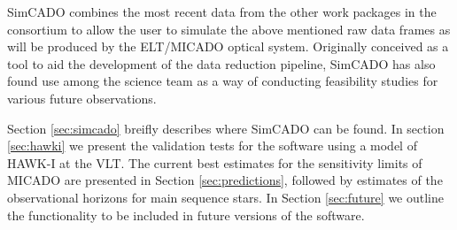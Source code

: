 SimCADO combines the most recent data from the other work packages in the consortium to allow the user to simulate the above mentioned raw data frames as will be produced by the ELT/MICADO optical system.
Originally conceived as a tool to aid the development of the data reduction pipeline, SimCADO has also found use among the science team as a way of conducting feasibility studies for various future observations.

Section \ref{sec:simcado} breifly describes where SimCADO can be found.
In section \ref{sec:hawki} we present the validation tests for the software using a model of HAWK-I at the VLT.
The current best estimates for the sensitivity limits of MICADO are presented in Section \ref{sec:predictions}, followed by estimates of the observational horizons for main sequence stars.
In Section \ref{sec:future} we outline the functionality to be included in future versions of the software.

